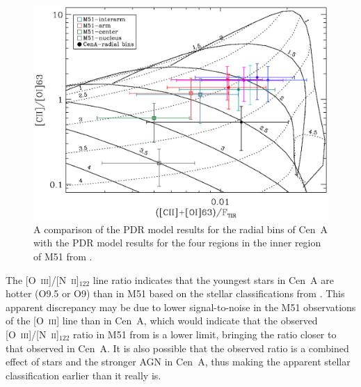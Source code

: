 \begin{figure}
\includegraphics[width=\columnwidth]{ch4/CenA_CIIOI63_vs_CIIOI63onFtir_corrected_plot_radial_bins_wM51overlay_v2}
\caption[Observed line ratios in Centaurus~A and M51 compared to the parameter space of a PDR model]{A comparison of the PDR model results for the radial bins of Cen~A with the PDR model results for the four regions in the inner region of M51 from \citet{parkin_2013}.}
\label{fig:pdr_comparison}
\end{figure}

The [O~\textsc{iii}]/[N~\textsc{ii}]$_{122}$ line ratio indicates that the youngest stars in Cen~A are hotter (O9.5 or O9) than in M51 \citep[B0; ][]{parkin_2013} based on the stellar classifications from \citet{1996ApJ...460..914V}.  This apparent discrepancy may be due to lower signal-to-noise in the M51 observations of the [O~\textsc{iii}] line than in Cen~A, which would indicate that the observed [O~\textsc{iii}]/[N~\textsc{ii}]$_{122}$ ratio in M51 from \citet{parkin_2013} is a lower limit, bringing the ratio closer to that observed in Cen~A.  It is also possible that the observed ratio is a combined effect of stars and the stronger AGN in Cen~A, thus making the apparent stellar classification earlier than it really is.


